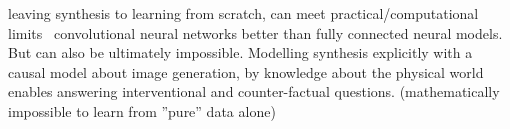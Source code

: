 	leaving synthesis to learning from scratch, can meet practical/computational limits \eg\ convolutional neural networks better than fully connected neural models.
	But can also be ultimately impossible. Modelling synthesis explicitly with a causal model about image generation, by knowledge about the physical world enables answering interventional and counter-factual questions. (mathematically impossible to learn from ''pure'' data alone)



